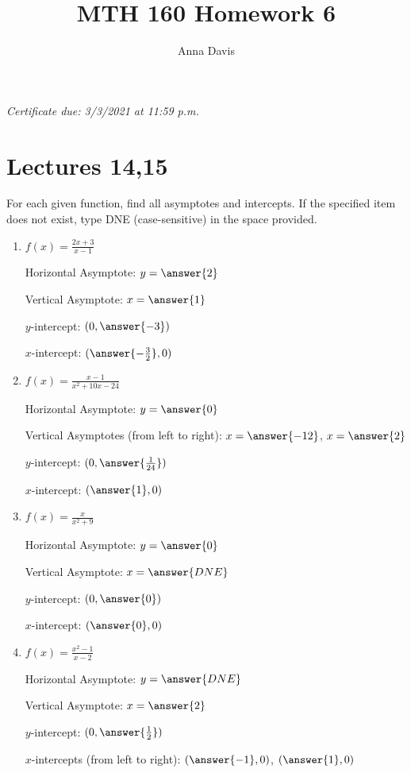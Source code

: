 \documentclass{ximera}
\author{Anna Davis} \title{MTH 160 Homework 6}
\begin{document}
\begin{abstract}

\end{abstract}
\maketitle
 \textit{Certificate due: 3/3/2021 at 11:59 p.m.}

 
  \section{Lectures 14,15}
 
 \begin{problem}\label{prob:160hom6prob2} 
 For each given function, find all asymptotes and intercepts.   If the specified item does not exist, type DNE (case-sensitive) in the space provided.  
  \begin{enumerate}
\item
$f(x)=\frac{2x+3}{x-1}$

Horizontal Asymptote: $y=\answer{2}$

Vertical Asymptote: $x=\answer{1}$

$y$-intercept: $(0, \answer{-3})$

$x$-intercept: $(\answer{-\frac{3}{2}},0)$

\item
$f(x)=\frac{x-1}{x^2+10x-24}$

Horizontal Asymptote: $y=\answer{0}$

Vertical Asymptotes (from left to right): $x=\answer{-12}$, $x=\answer{2}$

$y$-intercept: $(0, \answer{\frac{1}{24}})$

$x$-intercept: $(\answer{1},0)$
\item
$f(x)=\frac{x}{x^2+9}$

Horizontal Asymptote: $y=\answer{0}$

Vertical Asymptote: $x=\answer{DNE}$

$y$-intercept: $(0, \answer{0})$

$x$-intercept: $(\answer{0},0)$

\item
$f(x)=\frac{x^2-1}{x-2}$

Horizontal Asymptote: $y=\answer{DNE}$

Vertical Asymptote: $x=\answer{2}$

$y$-intercept: $(0, \answer{\frac{1}{2}})$

$x$-intercepts (from left to right): $(\answer{-1},0)$, $(\answer{1},0)$
  \end{enumerate}
\end{problem}
 
\end{document}
